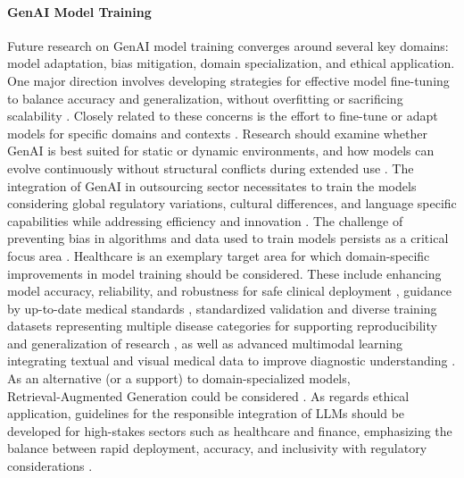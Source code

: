 \paragraph{GenAI Model Training}
Future research on GenAI model training converges around several key domains: model adaptation, bias mitigation, domain specialization, and ethical application.  
One major direction involves developing strategies for effective model fine-tuning to balance accuracy and generalization, without overfitting or sacrificing scalability \parencite{R01}. 
Closely related to these concerns is the effort to fine-tune or adapt models for specific domains and contexts \parencite{R02, R04}. Research should examine whether GenAI is best suited for static or dynamic environments, and how models can evolve continuously without structural conflicts during extended use \parencite{R07}. 
The integration of GenAI in outsourcing sector necessitates to train the models considering global regulatory variations, cultural differences, and language specific capabilities while addressing efficiency and innovation \parencite{R03}.  
The challenge of preventing bias in algorithms and data used to train models persists as a critical focus area \parencite{R01,R08}. 
Healthcare is an exemplary target area for which domain-specific improvements in model training should be considered. These include enhancing model accuracy, reliability, and robustness for safe clinical deployment \parencite{S16}, guidance by up-to-date medical standards \parencite{S03}, standardized validation and diverse training datasets representing multiple disease categories for supporting reproducibility and generalization of research \parencite{S07}, as well as advanced multimodal learning integrating textual and visual medical data to improve diagnostic understanding \parencite{S11}. As an alternative (or a support) to domain-specialized models, Retrieval‑Augmented Generation could be considered \parencite{S02}.  
As regards ethical application, guidelines for the responsible integration of LLMs should be developed for high-stakes sectors such as healthcare and finance, emphasizing the balance between rapid deployment, accuracy, and inclusivity with regulatory considerations \parencite{R01}.



